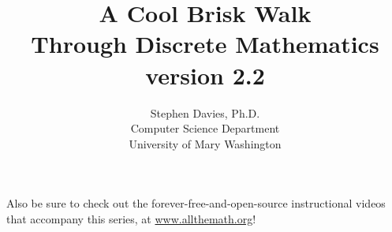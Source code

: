 \documentclass[11pt]{memoir}
\begin{document}
\title{A Cool Brisk Walk\\Through Discrete Mathematics\\{\small version
2.2}}
\author{Stephen Davies, Ph.D.\\Computer Science Department\\University of Mary Washington}
\date{}
\maketitle


\frontmatter

\pagebreak

\renewcommand{\contentsname}{Contents at a glance}
\setcounter{tocdepth}{0}
\tableofcontents

\vspace{.6in}
\begin{center}
\small
Also be sure to check out the forever-free-and-open-source instructional videos
that accompany this series, at \url{www.allthemath.org}!
\end{center}




\mainmatter

















\backmatter
\printindex
\end{document}

